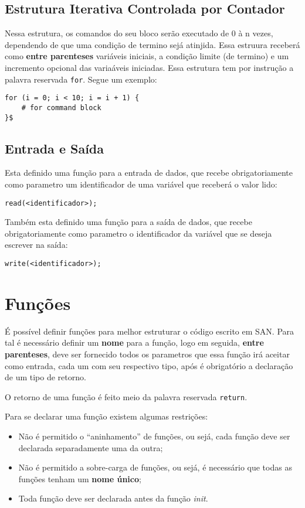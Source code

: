 \documentclass[a4paper,11pt]{article}
\begin{document}
\subsection{Estrutura Iterativa Controlada por Contador}
Nessa estrutura, os comandos do seu bloco serão executado de 0 à n vezes, dependendo de que
uma condição de termino sejá atinjida. Essa estruura receberá como \textbf{entre parenteses}
variáveis iniciais, a condição limite (de termino) e um incremento opcional das variaáveis
iniciadas. Essa estrutura tem por instrução a palavra reservada \texttt{for}. Segue um exemplo:
\begin{lstlisting}
for (i = 0; i < 10; i = i + 1) {
    # for command block
}$
\end{lstlisting}

\subsection{Entrada e Saída}
Esta definido uma função para a entrada de dados, que recebe obrigatoriamente como parametro
um identificador de uma variável que receberá o valor lido:
\begin{lstlisting}
read(<identificador>);
\end{lstlisting}

Também esta definido uma função para a saída de dados, que recebe obrigatoriamente como
parametro o identificador da variável que se deseja escrever na saída:
\begin{lstlisting}
write(<identificador>);
\end{lstlisting}

\section{Funções}
É possível definir funções para melhor estruturar o código escrito em SAN. Para tal é necessário
definir um \textbf{nome} para a função, logo em seguida, \textbf{entre parenteses}, deve ser
fornecido todos os parametros que essa função irá aceitar como entrada, cada um com seu respectivo
tipo, após é obrigatório a declaração de um tipo de retorno.

O retorno de uma função é feito meio da palavra reservada \texttt{return}.

Para se declarar uma função existem algumas restrições:
\begin{itemize}
    \item Não é permitido o ``aninhamento'' de funções, ou sejá, cada função deve ser declarada
    separadamente uma da outra;
    \item Não é permitido a sobre-carga de funções, ou sejá, é necessário que todas as funções
    tenham um \textbf{nome único};
    \item Toda função deve ser declarada antes da função \textit{init}.
\end{itemize}
\end{document}
